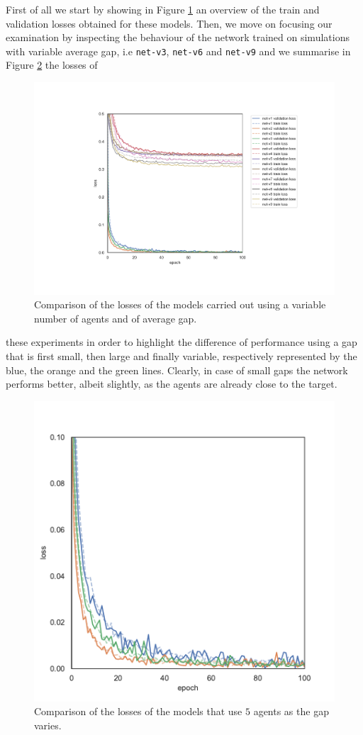 First of all we start by showing in Figure \ref{fig:t2lossallt} an overview of the train 
and validation losses obtained for these models.
Then, we move on focusing our examination by inspecting the behaviour of 
the 
network trained on simulations with variable average gap, i.e \texttt{net-v3}, 
\texttt{net-v6} and \texttt{net-v9} and we summarise in Figure 
\ref{fig:commlossn5t2} the losses of 
\begin{figure}[!htb]
	\centering
	\includegraphics[width=.7\textwidth]{contents/images/task2/loss-communication-all@}%
	\caption[Comparison of losses of the second set of experiments.]{Comparison 
		of the losses of the models carried out using a variable number of agents and 
		of average gap.}
	\label{fig:t2lossallt}
\end{figure}

\noindent
these experiments in order to highlight the 
difference of performance using a gap that is first small, then large and finally 
variable, respectively represented by the blue, the orange and the green lines.
Clearly, in case of small gaps the network performs better, albeit slightly, as 
the 
agents are already close to the target.

\begin{figure}[!htb]
	\centering
	\includegraphics[width=.45\textwidth]{contents/images/task2/loss-communication-N5}
	\caption{Comparison of the losses of the models that use $5$ agents as the gap 
		varies.}
	\label{fig:commlossn5t2}
\end{figure}
	
